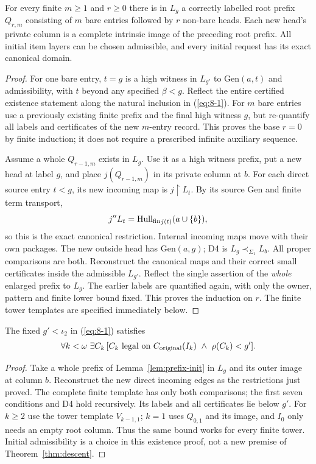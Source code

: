 \begin{lemma}\label{lem:prefix-init}
For every finite $m\ge1$ and $r\ge0$ there is in $L_g$ a correctly
labelled root prefix $Q_{r,m}$ consisting of $m$ bare entries followed
by $r$ non-bare heads. Each new head's private column is a complete
intrinsic image of the preceding root prefix. All initial item
layers can be chosen admissible, and every initial request has its
exact canonical domain.
\end{lemma}
\begin{proof}
For one bare entry, $t=g$ is a high witness in $L_{g'}$ to
Gen$(a,t)$ and admissibility, with $t$ beyond any specified
$\beta<g$. Reflect the entire certified existence statement along
the natural inclusion in (\ref{eq:8-1}). For $m$ bare entries use a previously
existing finite prefix and the final high witness $g$, but re-quantify
all labels and certificates of the new $m$-entry record. This proves
the base $r=0$ by finite induction; it does not require a prescribed
infinite auxiliary sequence.

Assume a whole $Q_{r-1,m}$ exists in $L_g$. Use it as a high witness
prefix, put a new head at label $g$, and place $j(Q_{r-1,m})$ in its
private column at $b$. For each direct source entry $t<g$, its new
incoming map is $j\restriction L_t$. By its source Gen and finite
term transport,
\[
 j''L_t=\operatorname{Hull_{fin}}_{j(t)}(a\cup\{b\}),
\]
so this is the exact canonical restriction. Internal incoming maps
move with their own packages. The new outside head has Gen$(a,g)$;
D4 is $L_g\prec_{\Sigma_1}L_b$. All proper comparisons are both.
Reconstruct the canonical maps and their correct small certificates
inside the admissible $L_{g'}$. Reflect the single assertion of the
\emph{whole} enlarged prefix to $L_g$. The earlier labels are
quantified again, with only the owner, pattern and finite lower
bound fixed. This proves the induction on $r$.
The finite tower templates are specified immediately below.
\end{proof}



\begin{theorem}\label{thm:initial}
The fixed $g'<\iota_2$ in (\ref{eq:8-1}) satisfies
\begin{equation}\label{eq:8-2}
 \forall k<\omega\ \exists C_k\,
 [C_k\text{ legal on }C_{\rm original}(I_k)\ \wedge\
                           \rho(C_k)<g'].                  
\end{equation}
\end{theorem}
\begin{proof}
Take a whole prefix of Lemma~\ref{lem:prefix-init} in $L_g$ and
its outer image at column $b$. Reconstruct the new direct incoming
edges as the restrictions just proved. The complete finite template
has only both comparisons; the first seven conditions and D4 hold
recursively. Its labels and all certificates lie below $g'$.
For $k\ge2$ use the tower template $V_{k-1,1}$; $k=1$ uses
$Q_{0,1}$ and its image, and $I_0$ only needs an empty root column.
Thus the same bound works for every finite tower. Initial
admissibility is a choice in this existence proof, not a new premise
of Theorem~\ref{thm:descent}. 
\end{proof}

